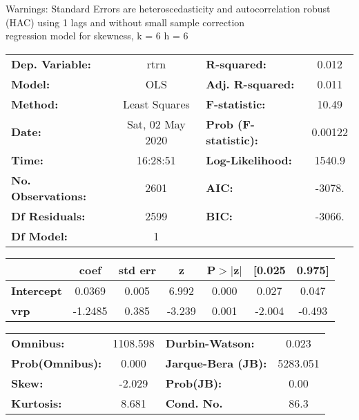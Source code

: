 Warnings: \newline
 [1] Standard Errors are heteroscedasticity and autocorrelation robust (HAC) using 1 lags and without small sample correction\\ 

regression model for skewness, k = 6 h = 6\begin{center}
\begin{tabular}{lclc}
\toprule
\textbf{Dep. Variable:}    &       rtrn       & \textbf{  R-squared:         } &     0.012   \\
\textbf{Model:}            &       OLS        & \textbf{  Adj. R-squared:    } &     0.011   \\
\textbf{Method:}           &  Least Squares   & \textbf{  F-statistic:       } &     10.49   \\
\textbf{Date:}             & Sat, 02 May 2020 & \textbf{  Prob (F-statistic):} &  0.00122    \\
\textbf{Time:}             &     16:28:51     & \textbf{  Log-Likelihood:    } &    1540.9   \\
\textbf{No. Observations:} &        2601      & \textbf{  AIC:               } &    -3078.   \\
\textbf{Df Residuals:}     &        2599      & \textbf{  BIC:               } &    -3066.   \\
\textbf{Df Model:}         &           1      & \textbf{                     } &             \\
\bottomrule
\end{tabular}
\begin{tabular}{lcccccc}
                   & \textbf{coef} & \textbf{std err} & \textbf{z} & \textbf{P$> |$z$|$} & \textbf{[0.025} & \textbf{0.975]}  \\
\midrule
\textbf{Intercept} &       0.0369  &        0.005     &     6.992  &         0.000        &        0.027    &        0.047     \\
\textbf{vrp}       &      -1.2485  &        0.385     &    -3.239  &         0.001        &       -2.004    &       -0.493     \\
\bottomrule
\end{tabular}
\begin{tabular}{lclc}
\textbf{Omnibus:}       & 1108.598 & \textbf{  Durbin-Watson:     } &    0.023  \\
\textbf{Prob(Omnibus):} &   0.000  & \textbf{  Jarque-Bera (JB):  } & 5283.051  \\
\textbf{Skew:}          &  -2.029  & \textbf{  Prob(JB):          } &     0.00  \\
\textbf{Kurtosis:}      &   8.681  & \textbf{  Cond. No.          } &     86.3  \\
\bottomrule
\end{tabular}
\end{center}

